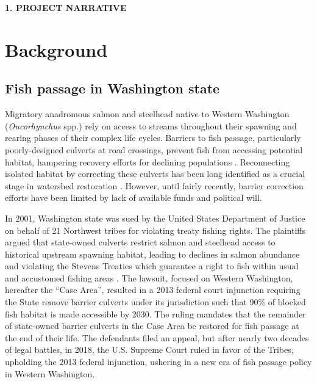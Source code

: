 \documentclass[12pt]{elsarticle}
\begin{document}
\begin{center} \textbf{1. PROJECT NARRATIVE} \end{center}

\section{Background}

\subsection*{Fish passage in Washington state}

Migratory anadromous salmon and steelhead native to Western Washington (\textit{Oncorhynchus} spp.) rely on access to streams throughout their spawning and rearing phases of their complex life cycles. Barriers to fish passage, particularly poorly-designed culverts at road crossings, prevent fish from accessing potential habitat, hampering recovery efforts for declining populations \citep{noauthor_2020_2020}. Reconnecting isolated habitat by correcting these culverts has been long identified as a crucial stage in watershed restoration \citep{roni_review_2002}. However, until fairly recently, barrier correction efforts have been limited by lack of available funds and political will. 

In 2001, Washington state was sued by the United States Department of Justice on behalf of 21 Northwest tribes for violating treaty fishing rights. The plaintiffs argued that state-owned culverts restrict salmon and steelhead access to historical upstream spawning habitat, leading to declines in salmon abundance and violating the Stevens Treaties which guarantee a right to fish within usual and accustomed fishing areas \citep{hickey_highway_2018}. The lawsuit, focused on Western Washington, hereafter the ``Case Area'', resulted in a 2013 federal court injunction requiring the State remove barrier culverts under its jurisdiction such that 90\% of blocked fish habitat is made accessible by 2030. The ruling mandates that the remainder of state-owned barrier culverts in the Case Area be restored for fish passage at the end of their life. The defendants filed an appeal, but after nearly two decades of legal battles, in 2018, the U.S. Supreme Court ruled in favor of the Tribes, upholding the 2013 federal injunction, ushering in a new era of fish passage policy in Western Washington. 
\end{document}
